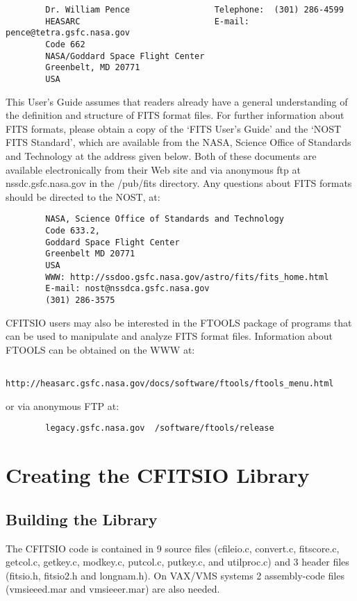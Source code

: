 \begin{verbatim}
        Dr. William Pence                 Telephone:  (301) 286-4599
        HEASARC                           E-mail: pence@tetra.gsfc.nasa.gov
        Code 662
        NASA/Goddard Space Flight Center
        Greenbelt, MD 20771
        USA
\end{verbatim}
This User's Guide assumes that readers already have a general
understanding of the definition and structure of FITS format files.
For further information about FITS formats, please obtain a copy of the
`FITS User's Guide' and the `NOST FITS Standard', which are available
from the NASA, Science Office of Standards and Technology at the
address given below.  Both of these documents are available
electronically from their Web site and via anonymous ftp at
nssdc.gsfc.nasa.gov in the /pub/fits directory. Any questions about
FITS formats should be directed to the NOST, at:

\begin{verbatim}
        NASA, Science Office of Standards and Technology
        Code 633.2,
        Goddard Space Flight Center
        Greenbelt MD 20771
        USA
        WWW: http://ssdoo.gsfc.nasa.gov/astro/fits/fits_home.html
        E-mail: nost@nssdca.gsfc.nasa.gov
        (301) 286-3575
\end{verbatim}
CFITSIO users may also be interested in the FTOOLS package of programs
that can be used to manipulate and analyze FITS format files.
Information about FTOOLS can be obtained on the WWW at:

\begin{verbatim}
        http://heasarc.gsfc.nasa.gov/docs/software/ftools/ftools_menu.html
\end{verbatim}
or via anonymous FTP at:

\begin{verbatim}
        legacy.gsfc.nasa.gov  /software/ftools/release
\end{verbatim}

\chapter{ Creating the CFITSIO Library }


\section{Building the Library}

The CFITSIO code is contained in 9 source files (cfileio.c, convert.c,
fitscore.c, getcol.c, getkey.c, modkey.c, putcol.c, putkey.c, and
utilproc.c) and 3 header files (fitsio.h, fitsio2.h and longnam.h).
On VAX/VMS systems 2 assembly-code files (vmsieeed.mar and
vmsieeer.mar) are also needed.

